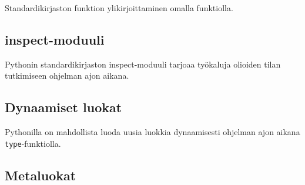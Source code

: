 \documentclass[finnish]{tktltiki2}
\theoremstyle{definition}
\theoremstyle{remark}
\begin{document}
\begin{listing}
    \inputminted[linenos]{python}{code/introspektio2.py}
    \caption{Standardikirjaston funktion ylikirjoittaminen omalla funktiolla.}
    \label{lst:ex_intro2}
\end{listing}


\subsection{inspect-moduuli}

Pythonin standardikirjaston inspect-moduuli tarjoaa työkaluja olioiden tilan tutkimiseen ohjelman ajon aikana. 

\subsection{Dynaamiset luokat}

Pythonilla on mahdollista luoda uusia luokkia dynaamisesti ohjelman ajon aikana \verb|type|-funktiolla.


\subsection{Metaluokat}







\end{document}
